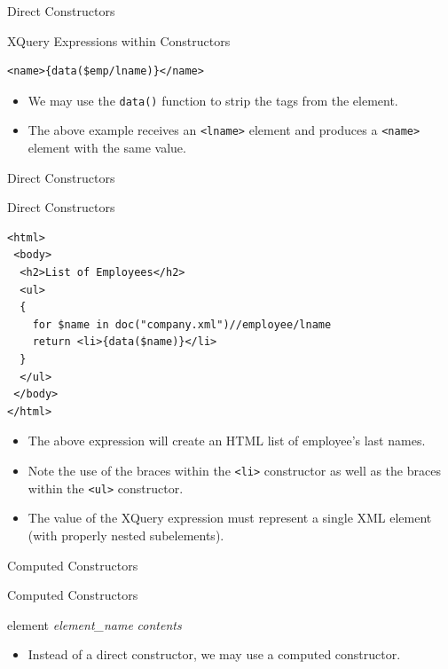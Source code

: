 \documentclass[svgnames]{beamer}
\begin{document}
\begin{frame}[fragile]{Direct Constructors}
\small
\begin{block}{XQuery Expressions within Constructors}
\begin{verbatim}
<name>{data($emp/lname)}</name>
\end{verbatim}
\end{block}
\normalsize
\begin{itemize}
	\item We may use the \texttt{data()} function to strip the tags from the element.
	\item The above example receives an \texttt{<lname>} element and produces a \texttt{<name>} element with the same value.
\end{itemize}
\end{frame}

\begin{frame}[fragile]{Direct Constructors}
\small
\begin{block}{Direct Constructors}
\scriptsize
\begin{verbatim}
<html>
 <body>
  <h2>List of Employees</h2>
  <ul>
  {
    for $name in doc("company.xml")//employee/lname
    return <li>{data($name)}</li>
  }
  </ul>
 </body>
</html>
\end{verbatim}
\end{block}
\normalsize
\begin{itemize}
	\item The above expression will create an HTML list of employee's last names.
	\item Note the use of the braces within the \texttt{<li>} constructor as well as the braces within the \texttt{<ul>} constructor.
	\item The value of the XQuery expression must represent a single XML element (with properly nested subelements).
\end{itemize}
\end{frame}

\begin{frame}[fragile]{Computed Constructors}
\small
\begin{block}{Computed Constructors}
\begin{semiverbatim}
element \emph{element_name} {\emph{contents}}
\end{semiverbatim}
\end{block}
\normalsize
\begin{itemize}
	\item Instead of a direct constructor, we may use a \alert{computed constructor}.
\end{itemize}
\end{frame}
\end{document}
